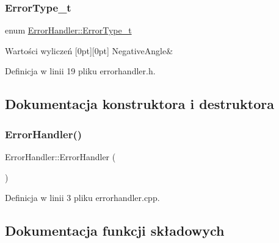 \subsubsection{\texorpdfstring{Error\+Type\+\_\+t}{ErrorType\_t}}
{\footnotesize\ttfamily enum \hyperlink{class_error_handler_aee61709d471d61ec7d1069369565b59a}{Error\+Handler\+::\+Error\+Type\+\_\+t}}

\begin{DoxyEnumFields}{Wartości wyliczeń}
[0pt][0pt]{}\mbox{\label{class_error_handler_aee61709d471d61ec7d1069369565b59aa1ecd3180072ace794160f0cfcfea9458}} 
Negative\+Angle&\\
\hline

\end{DoxyEnumFields}


Definicja w linii 19 pliku errorhandler.\+h.



\subsection{Dokumentacja konstruktora i destruktora}
\mbox{\label{class_error_handler_a7e5f379bd231442b898cef94556b2107}} 
\subsubsection{\texorpdfstring{Error\+Handler()}{ErrorHandler()}}
{\footnotesize\ttfamily Error\+Handler\+::\+Error\+Handler (\begin{DoxyParamCaption}{ }\end{DoxyParamCaption})}



Definicja w linii 3 pliku errorhandler.\+cpp.



\subsection{Dokumentacja funkcji składowych}
\mbox{\label{class_error_handler_a418fa4905c14ec2682fffc2c956afa4a}} 
